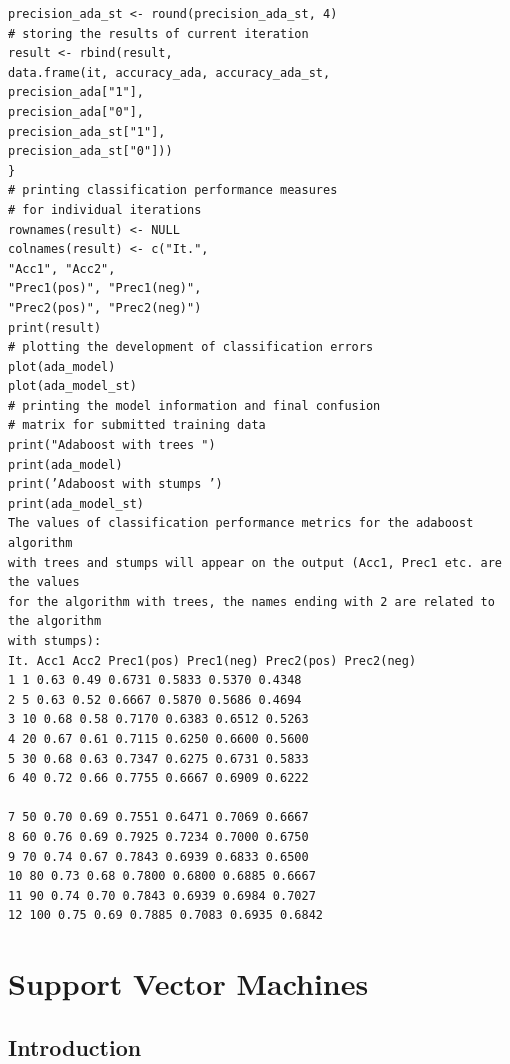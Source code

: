 \documentclass[11pt,openany,executivepaper]{book}
\begin{document}
\begin{verbatim}
precision_ada_st <- round(precision_ada_st, 4)
# storing the results of current iteration
result <- rbind(result,
data.frame(it, accuracy_ada, accuracy_ada_st,
precision_ada["1"],
precision_ada["0"],
precision_ada_st["1"],
precision_ada_st["0"]))
}
# printing classification performance measures
# for individual iterations
rownames(result) <- NULL
colnames(result) <- c("It.",
"Acc1", "Acc2",
"Prec1(pos)", "Prec1(neg)",
"Prec2(pos)", "Prec2(neg)")
print(result)
# plotting the development of classification errors
plot(ada_model)
plot(ada_model_st)
# printing the model information and final confusion
# matrix for submitted training data
print("Adaboost with trees ")
print(ada_model)
print(’Adaboost with stumps ’)
print(ada_model_st)
The values of classification performance metrics for the adaboost algorithm
with trees and stumps will appear on the output (Acc1, Prec1 etc. are the values
for the algorithm with trees, the names ending with 2 are related to the algorithm
with stumps):
It. Acc1 Acc2 Prec1(pos) Prec1(neg) Prec2(pos) Prec2(neg)
1 1 0.63 0.49 0.6731 0.5833 0.5370 0.4348
2 5 0.63 0.52 0.6667 0.5870 0.5686 0.4694
3 10 0.68 0.58 0.7170 0.6383 0.6512 0.5263
4 20 0.67 0.61 0.7115 0.6250 0.6600 0.5600
5 30 0.68 0.63 0.7347 0.6275 0.6731 0.5833
6 40 0.72 0.66 0.7755 0.6667 0.6909 0.6222

7 50 0.70 0.69 0.7551 0.6471 0.7069 0.6667
8 60 0.76 0.69 0.7925 0.7234 0.7000 0.6750
9 70 0.74 0.67 0.7843 0.6939 0.6833 0.6500
10 80 0.73 0.68 0.7800 0.6800 0.6885 0.6667
11 90 0.74 0.70 0.7843 0.6939 0.6984 0.7027
12 100 0.75 0.69 0.7885 0.7083 0.6935 0.6842
\end{verbatim}

\chapter{Support Vector Machines} %

\section{Introduction}
\end{document}
